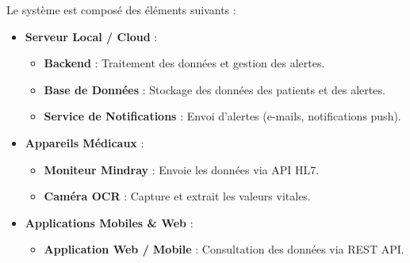 Le système est composé des éléments suivants
:

\begin{itemize}
    \item \textbf{Serveur Local / Cloud} :
    \begin{itemize}
        \item \textbf{Backend} : Traitement des données et gestion des alertes.
        \item \textbf{Base de Données} : Stockage des données des patients et des alertes.
        \item \textbf{Service de Notifications} : Envoi d’alertes (e-mails, notifications push).
    \end{itemize}
    \item \textbf{Appareils Médicaux} :
    \begin{itemize}
        \item \textbf{Moniteur Mindray} : Envoie les données via API HL7.
        \item \textbf{Caméra OCR} : Capture et extrait les valeurs vitales.
    \end{itemize}
    \item \textbf{Applications Mobiles \& Web} :
    \begin{itemize}
        \item \textbf{Application Web / Mobile} : Consultation des données via REST API.
    \end{itemize}
\end{itemize}


